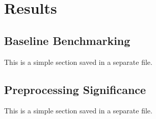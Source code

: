 \chapter[Results]{Results}
\label{chp:labelkey}
\begin{info}
\end{info}

\section{Baseline Benchmarking}
\begin{info}{}
	This is a simple section saved in a separate file.
\end{info}

\section{Preprocessing Significance}
\begin{info}{}
	This is a simple section saved in a separate file.
\end{info}
